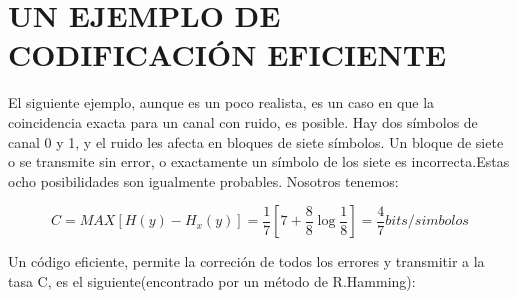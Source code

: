 \section{ UN EJEMPLO DE CODIFICACI\'ON EFICIENTE}

El siguiente ejemplo, aunque es un poco realista, es un caso en que la coincidencia exacta para un canal con ruido, 
es posible. Hay dos s\'imbolos de canal 0 y 1, y el ruido les afecta en bloques de siete s\'imbolos. 
Un bloque de siete o se transmite sin error, o exactamente un s\'imbolo de los siete es incorrecta.Estas 
ocho posibilidades son igualmente probables. Nosotros tenemos:

\begin{equation}
C = MAX[ H(y) - H_x(y) ]
= \frac{1}{7}[7 + \frac{8}{8}\log{\frac{1}{8}}]
= \frac{4}{7} bits/simbolos
\end{equation}
 
Un c\'odigo eficiente, permite la correci\'on de todos los errores y transmitir a la tasa C, es el 
siguiente(encontrado por un m\'etodo de R.Hamming):
